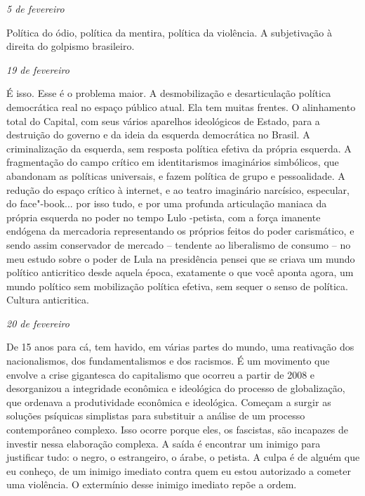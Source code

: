 \begin{flushright}
\emph{5 de fevereiro}
\end{flushright}

Política do ódio, política da mentira, política da violência. A
subjetivação à direita do golpismo brasileiro.

\pagebreak

\begin{flushright}
\emph{19 de fevereiro}
\end{flushright}

É isso. Esse é o problema maior. A desmobilização e desarticulação
política democrática real no espaço público atual. Ela tem muitas
frentes. O alinhamento total do Capital, com seus vários aparelhos
ideológicos de Estado, para a destruição do governo e da ideia da
esquerda democrática no Brasil. A criminalização da esquerda, sem
resposta política efetiva da própria esquerda. A fragmentação do campo
crítico em identitarismos imaginários simbólicos, que abandonam as
políticas universais, e fazem política de grupo e pessoalidade. A
redução do espaço crítico à internet, e ao teatro imaginário narcísico,
especular, do face"-book... por isso tudo, e por uma profunda articulação
maniaca da própria esquerda no poder no tempo Lulo -petista, com a força
imanente endógena da mercadoria representando os próprios feitos do
poder carismático, e sendo assim conservador de mercado -- tendente ao
liberalismo de consumo -- no meu estudo sobre o poder de Lula na
presidência pensei que se criava um mundo político anticritico desde
aquela época, exatamente o que você aponta agora, um mundo político sem
mobilização política efetiva, sem sequer o senso de política. Cultura
anticritica.

\begin{flushright}
\emph{20 de fevereiro}
\end{flushright}

De 15 anos para cá, tem havido, em várias partes do mundo, uma
reativação dos nacionalismos, dos fundamentalismos e dos racismos. É um
movimento que envolve a crise gigantesca do capitalismo que ocorreu a
partir de 2008 e desorganizou a integridade econômica e ideológica do
processo de globalização, que ordenava a produtividade econômica e
ideológica. Começam a surgir as soluções psíquicas simplistas para
substituir a análise de um processo contemporâneo complexo. Isso ocorre
porque eles, os fascistas, são incapazes de investir nessa elaboração
complexa. A saída é encontrar um inimigo para justificar tudo: o negro,
o estrangeiro, o árabe, o petista. A culpa é de alguém que eu conheço,
de um inimigo imediato contra quem eu estou autorizado a cometer uma
violência. O extermínio desse inimigo imediato repõe a ordem.

